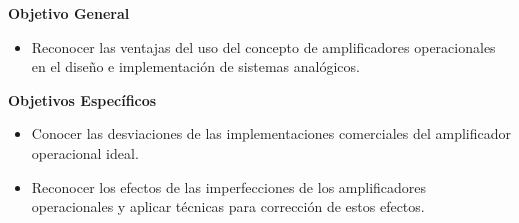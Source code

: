\textbf{Objetivo General}

\begin{itemize}
    \item Reconocer las ventajas del uso del concepto de amplificadores operacionales en el diseño e implementación de sistemas analógicos.
\end{itemize}

\textbf{Objetivos Específicos}

\begin{itemize}
    \item Conocer las desviaciones de las implementaciones comerciales del amplificador operacional ideal.
    \item Reconocer los efectos de las imperfecciones de los amplificadores operacionales y aplicar técnicas para corrección de estos efectos.
\end{itemize}

